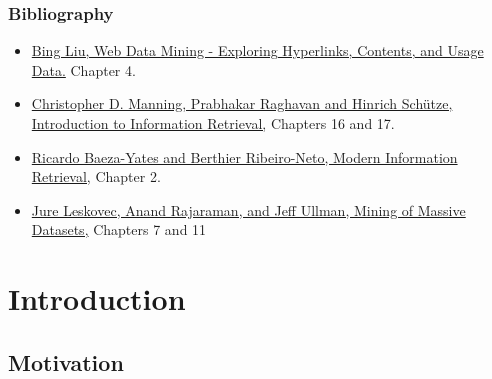 \documentclass{beamer}
\subtitle{Document Clustering and Dimensionality Reduction}
\begin{document}
\maketitle



\begin{frame}
    \frametitle{Bibliography}
    \begin{block}{}
        \begin{itemize}
        \item \href{https://www.cs.uic.edu/~liub/WebMiningBook.html}{Bing Liu, Web Data Mining - Exploring Hyperlinks, Contents, and Usage Data.} Chapter 4.

        \item \href{http://nlp.stanford.edu/IR-book/}{Christopher D. Manning, Prabhakar Raghavan and Hinrich Schütze, Introduction to Information Retrieval,} Chapters 16 and 17.

        \item \href{http://www.mir2ed.org}{Ricardo Baeza-Yates and Berthier Ribeiro-Neto, Modern Information Retrieval,} Chapter 2.

        \item \href{http://www.mmds.org}{Jure Leskovec, Anand Rajaraman, and Jeff Ullman, Mining of Massive Datasets,} Chapters 7 and 11
        \end{itemize}
    \end{block}
\end{frame}

\section{Introduction}

\subsection{Motivation}
\end{document}
